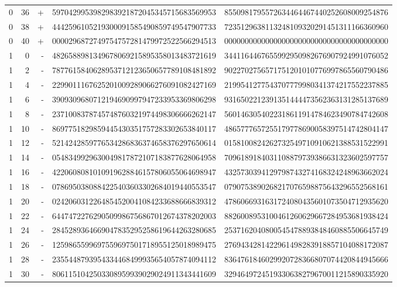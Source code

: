 \begin{longtable}{rrrll}
0 & 36 & + & 5970429953982983921872045345715683569953 & 8550981795572634464467440252608009254876 \\
0 & 38 & + & 4442596105219300091585490859749547907733 & 7235129638113248109320291451311166360960 \\
0 & 40 & + & 0000296872749754757281479972522566294513 & 0000000000000000000000000000000000000000 \\
1 & 0 & - & 4826588981349678069215895358013483721619 & 3441164467655992950982676907924991076052 \\
1 & 2 & - & 7877615840628953712123650657789108481892 & 9022702756571751201010776997865560790486 \\
1 & 4 & - & 2299011167625201009289066276091082427169 & 2199541277543707779980341374217552237885 \\
1 & 6 & - & 3909309680712194690997947233953369806298 & 9316502212391351444473562363131285137689 \\
1 & 8 & - & 2371008378745748760321974498306666262147 & 5601463054022318611914784623490784742608 \\
1 & 10 & - & 8697751829859445430351757283302653840117 & 4865777657255179778690058397514742804147 \\
1 & 12 & - & 5214242859776534286836374658376297650614 & 0158100824262732549710910621388531522991 \\
1 & 14 & - & 0548349929630049817872107183877628064958 & 7096189184031108879739386631323602597757 \\
1 & 16 & - & 4220608081010919628846157806055064698947 & 4325730394129798743274168324248963662024 \\
1 & 18 & - & 0786950380884225403603302684019440553547 & 0790753890268217076598875643296552568161 \\
1 & 20 & - & 0242060312264854520041084233688666839312 & 4786066931631724080435601073504712935620 \\
1 & 22 & - & 6447472276290509986756867012674378202003 & 8826008953100461260629667284953681938424 \\
1 & 24 & - & 2845289364669047835295258619644263280685 & 2537162040800545478893848460885506645749 \\
1 & 26 & - & 1259865599697559697501718955125018989475 & 2769434281422961498283918857104088172087 \\
1 & 28 & - & 2355448793954334468499935654057874094112 & 8364761846029920728366807074420844945666 \\
1 & 30 & - & 8061151042503308959939029024911343441609 & 3294649724519330638279670011215890335920 \\

\end{longtable}
